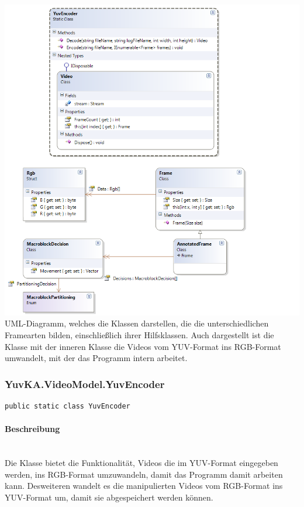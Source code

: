 	
\includegraphics[width=\textwidth]{YuvKA.VideoModel/videomodel.png}
UML-Diagramm, welches die Klassen darstellen, die die unterschiedlichen Framearten bilden, einschließlich ihrer Hilfsklassen. Auch dargestellt ist die Klasse  mit der inneren Klasse  die Videos vom YUV-Format ins RGB-Format umwandelt, mit der das Programm intern arbeitet.

\subsubsection{YuvKA.VideoModel.YuvEncoder}

\begin{verbatim}
public static class YuvEncoder
\end{verbatim}

\paragraph{Beschreibung}~\\
Die Klasse  bietet die Funktionalität, Videos die im YUV-Format eingegeben werden, ins RGB-Format umzuwandeln, damit das Programm damit arbeiten kann. Desweiteren wandelt es die manipulierten Videos vom RGB-Format ins YUV-Format um, damit sie abgespeichert werden können.

